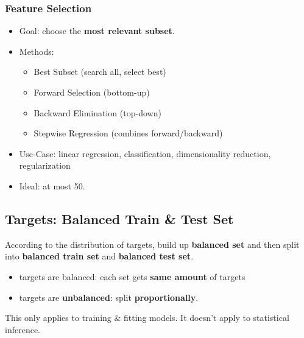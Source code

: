 \subsubsection{Feature Selection}
\begin{itemize}
	\item Goal: choose the \textbf{most relevant subset}.
	\item Methods:
	\begin{itemize}
		\item Best Subset (search all, select best)
		\item Forward Selection (bottom-up)
		\item Backward Elimination (top-down)
		\item Stepwise Regression (combines forward/backward)
	\end{itemize}
	\item Use-Case: linear regression, classification, dimensionality reduction, regularization
	\item Ideal: at most 50.
\end{itemize}
\subsection{Targets: Balanced Train \& Test Set}
According to the distribution of targets, build up \textbf{balanced set} and then split into \textbf{balanced train set} and \textbf{balanced test set}. 
\begin{itemize}
	\item targets are balanced: each set gets \textbf{same amount} of targets
	\item targets are \textbf{unbalanced}: split \textbf{proportionally}.
\end{itemize}
This only applies to training \& fitting models. It doesn't apply to statistical inference.

